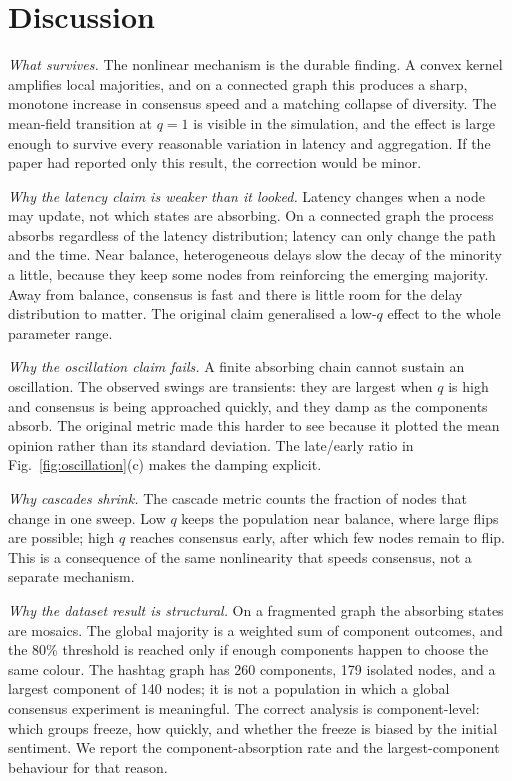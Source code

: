 \documentclass[conference]{IEEEtran}
\begin{document}
\section{Discussion}

\emph{What survives.} The nonlinear mechanism is the durable finding. A convex kernel amplifies local majorities, and on a connected graph this produces a sharp, monotone increase in consensus speed and a matching collapse of diversity. The mean-field transition at $q=1$ is visible in the simulation, and the effect is large enough to survive every reasonable variation in latency and aggregation. If the paper had reported only this result, the correction would be minor.

\emph{Why the latency claim is weaker than it looked.} Latency changes when a node may update, not which states are absorbing. On a connected graph the process absorbs regardless of the latency distribution; latency can only change the path and the time. Near balance, heterogeneous delays slow the decay of the minority a little, because they keep some nodes from reinforcing the emerging majority. Away from balance, consensus is fast and there is little room for the delay distribution to matter. The original claim generalised a low-$q$ effect to the whole parameter range.

\emph{Why the oscillation claim fails.} A finite absorbing chain cannot sustain an oscillation. The observed swings are transients: they are largest when $q$ is high and consensus is being approached quickly, and they damp as the components absorb. The original metric made this harder to see because it plotted the mean opinion rather than its standard deviation. The late/early ratio in Fig.~\ref{fig:oscillation}(c) makes the damping explicit.

\emph{Why cascades shrink.} The cascade metric counts the fraction of nodes that change in one sweep. Low $q$ keeps the population near balance, where large flips are possible; high $q$ reaches consensus early, after which few nodes remain to flip. This is a consequence of the same nonlinearity that speeds consensus, not a separate mechanism.

\emph{Why the dataset result is structural.} On a fragmented graph the absorbing states are mosaics. The global majority is a weighted sum of component outcomes, and the 80\% threshold is reached only if enough components happen to choose the same colour. The hashtag graph has 260 components, 179 isolated nodes, and a largest component of 140 nodes; it is not a population in which a global consensus experiment is meaningful. The correct analysis is component-level: which groups freeze, how quickly, and whether the freeze is biased by the initial sentiment. We report the component-absorption rate and the largest-component behaviour for that reason.
\end{document}
